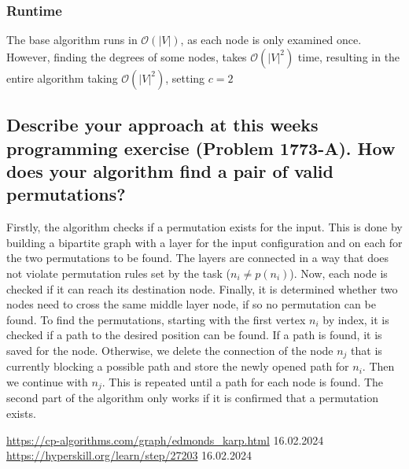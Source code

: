 \documentclass[runningheads]{llncs}
\begin{document}
\subsubsection*{Runtime} The base algorithm runs in $\mathcal{O}(|V|)$, as each node is only examined once. However, finding the degrees of some nodes, takes $\mathcal{O}(|V|^2)$ time, resulting in the entire algorithm taking $\mathcal{O}(|V|^2)$, setting $c = 2$

\subsection*{Describe your approach at this weeks programming exercise (Problem 1773-A). How does your algorithm find a pair of valid permutations?}
Firstly, the algorithm checks if a permutation exists for the input. This is done by building a bipartite graph with a layer for the input configuration and on each for the two permutations to be found. The layers are connected in a way that does not violate
permutation rules set by the task ($n_i \neq p(n_i)$). Now, each node is checked if it can reach its destination node. Finally, it is determined whether two nodes need to cross the same middle layer node, if so no permutation can be found. To find the
permutations, starting with the first vertex $n_i$ by index, it is checked if a path to the desired position can be found. If a path is found, it is saved for the node. Otherwise, we delete the connection of the node $n_j$ that is currently blocking a
possible path and store the newly opened path for $n_i$. Then we continue with $n_j$. This is repeated until a path for each node is found. The second part of the algorithm only works if it is confirmed that a permutation exists.

\begin{thebibliography}{8}
     \url{https://cp-algorithms.com/graph/edmonds\_karp.html} 16.02.2024
     \url{https://hyperskill.org/learn/step/27203} 16.02.2024

\end{thebibliography}
\end{document}
